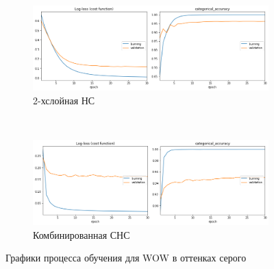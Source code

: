 \begin{figure}[p]
    \centering

    \begin{subfigure}{\textwidth}
        \includegraphics[width=\textwidth]{include/graphics/experimental_plots/grayscale/french_wow}
                    \caption{2-хслойная НС}
    \end{subfigure}
    ~
    \begin{subfigure}{\textwidth}
        \includegraphics[width=\textwidth]{include/graphics/experimental_plots/grayscale/mixed_wow}
                    \caption{Комбинированная СНС}
    \end{subfigure}

   \caption{Графики процесса обучения для WOW в оттенках серого}
    \label{fig:GrayscalePlotsWOW}
\end{figure}


